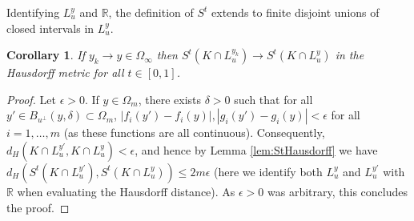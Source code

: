 \documentclass[11pt]{article}
\newtheorem{cor}[thm]{Corollary}
\theoremstyle{definition}
\theoremstyle{proof}
\DeclareMathOperator{\+}{\mathop{\tilde{+}}}
\newcommand{\abs}[1]{\left\vert#1\right\vert}
\newcommand{\R}{\mathbb{R}}
\newcommand{\eps}{\epsilon}
\numberwithin{equation}{section}
\numberwithin{equation}{section}
\begin{document}
Identifying $L_u^y$ and $\R$, the definition of $S^t$ extends to finite disjoint unions of closed intervals in $L_u^y$. 
\begin{cor} \label{cor:fibers-converge}
If $y_k \rightarrow y \in \Omega_\infty$ then $S^t (K \cap L^{y_k}_u) \rightarrow S^t (K \cap L^{y}_u)$ in the Hausdorff metric for all $t \in [0,1]$. 
\end{cor}
\begin{proof}
Let $\eps > 0$. If $y \in \Omega_m$, there exists $\delta > 0$ such that for all $y' \in B_{u^{\perp}}(y,\delta) \subset \Omega_m$, $\abs{f_i(y') - f_i(y)} , \abs{g_i(y') - g_i(y)} < \eps$ for all $i=1,\ldots,m$ (as these functions are all continuous). Consequently, $d_H(K \cap L^{y'}_u, K \cap L^y_u) < \eps$, and hence by Lemma \ref{lem:StHausdorff} we have $d_H(S^t (K \cap L^{y'}_u), S^t (K \cap L^{y}_u)) \leq 2 m \eps$ (here we identify both $L^{y}_u$ and $L^{y'}_u$ with $\R$ when evaluating the Hausdorff distance). As $\eps > 0$ was arbitrary, this concludes the proof. 
\end{proof}
\end{document}
